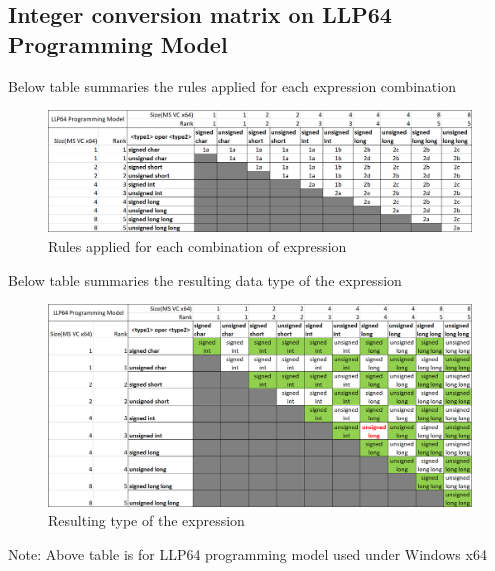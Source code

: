 \documentclass{article}
\begin{document}
\subsection{Integer conversion matrix on LLP64 Programming Model}
Below table summaries the rules applied for each expression combination
\begin{figure}[H]
\centering
\includegraphics[width=\textwidth]{Integer-Arithmetic-All-Datatypes.png}
\caption{Rules applied for each combination of expression}
\end{figure}

Below table summaries the resulting data type of the expression
\begin{figure}[H]
\centering
\includegraphics[width=\textwidth]{Resulting-Datatypes.png}
\caption{Resulting type of the expression}
\end{figure}

Note: Above table is for LLP64 programming model used under Windows x64
\end{document}
